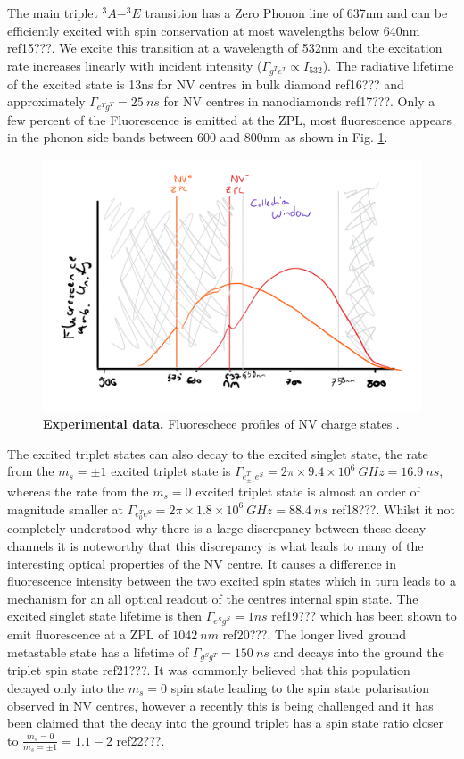 \documentclass[preprint,prl]{revtex4}
\begin{document}
The main triplet $^3A-^3E$ transition has a Zero Phonon line of 637nm and can be efficiently excited with spin conservation at most wavelengths below 640nm ref15???. We excite this transition at a wavelength of 532nm and the excitation rate increases linearly with incident intensity ($\Gamma_{g^Te^T} \propto I_{532}$). The radiative lifetime of the excited state is 13ns for NV centres in bulk diamond ref16??? and approximately $\Gamma_{e^Tg^T} = \SI{25}{ns}$ for NV centres in nanodiamonds ref17???. Only a few percent of the Fluorescence is emitted at the ZPL, most fluorescence appears in the phonon side bands between 600 and 800nm as shown in Fig. \ref{FigFluoro}.

\begin{figure}[t]
  \centering
  \includegraphics[width=1\textwidth]{Fluoro.png} 
 \caption{\textbf{Experimental data.} Fluoreschece profiles of NV charge states .} \label{FigFluoro}
\end{figure}

The excited triplet states can also decay to the excited singlet state, the rate from the $m_s=\pm1$ excited triplet state is $\Gamma_{e^T_{\pm1}e^S} = 2\pi\times9.4\times10^6\SI{}{GHz} = \SI{16.9}{ns}$, whereas the rate from the $m_s=0$ excited triplet state is almost an order of magnitude smaller at $\Gamma_{e^T_{0}e^S} = 2\pi\times1.8\times10^6 \SI{}{GHz} = \SI{88.4}{ns}$ ref18???. Whilst it not completely understood why there is a large discrepancy between these decay channels it is noteworthy that this discrepancy is what leads to many of the interesting optical properties of the NV centre. It causes a difference in fluorescence intensity between the two excited spin states which in turn leads to a mechanism for an all optical readout of the centres internal spin state. The excited singlet state lifetime is then $\Gamma_{e^Sg^S} = \si{1}{ns}$ ref19??? which has been shown to emit fluorescence at a ZPL of $\SI{1042}{nm}$ ref20???. The longer lived ground metastable state has a lifetime of $\Gamma_{g^Sg^T} = \SI{150}{ns}$ and decays into the ground the triplet spin state ref21???. It was commonly believed that this population decayed only into the $m_s=0$ spin state leading to the spin state polarisation observed in NV centres, however a recently this is being challenged and it has been claimed that the decay into the ground triplet has a spin state ratio closer to $\frac{m_s=0}{m_s=\pm1} = 1.1-2$ ref22???. 
\end{document}
